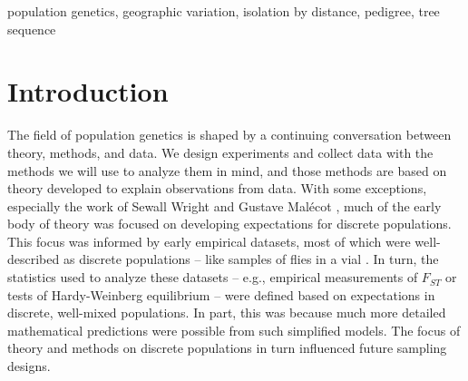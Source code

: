 \documentclass{ar-1col}
\begin{document}
\ifsubmissionversion
\begin{keywords}
population genetics, geographic variation, isolation by distance, pedigree, tree sequence
\end{keywords}
\maketitle
\else
\newpage
\fi

\tableofcontents

\ifsubmissionversion
\else
	\newpage
\fi

\section{Introduction}

The field of population genetics is shaped by a continuing conversation
between theory, methods, and data.
We design experiments and collect data
with the methods we will use to analyze them in mind, 
and those methods are based on theory
developed to explain observations from data.
With some exceptions,
especially the work of Sewall Wright \citeyearpar{Wright1940,Wright1943,wright1946isolation}
and Gustave Mal\'ecot \citeyearpar{malecot},
much of the early body of theory was focused on
developing expectations for discrete populations.
This focus was informed by early empirical datasets,
most of which
\citep[again, with exceptions, like][]{Dobzhansky_Wright1943, dobzhansky1947}
were well-described as discrete populations --
like samples of flies in a vial \citep{lewontin1974}.
In turn, 
the statistics used to analyze these datasets --
e.g., empirical measurements of $F_{ST}$ \citep{Wright1951}
or tests of Hardy-Weinberg equilibrium \citep{hardy1908,weinberg1908} --
were defined based on expectations in discrete, well-mixed populations.
In part, this was because much more detailed mathematical predictions 
were possible from such simplified models.
The focus of theory and methods on discrete populations in turn influenced
future sampling designs.
\end{document}
